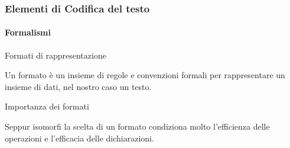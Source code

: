\begin{frame}
	\frametitle{Elementi di Codifica del testo}
	\framesubtitle{Formalismi}
	\addtocounter{nframe}{1}

	\begin{block}{Formati di rappresentazione}
		\begin{center}
			Un formato è un insieme di regole e convenzioni formali per rappresentare un insieme di dati, nel nostro caso un testo.
		\end{center}

	\end{block}

	\begin{block}{Importanza dei formati}
		\begin{center}
			Seppur isomorfi la scelta di un formato condiziona molto l'efficienza delle operazioni e l'efficacia delle dichiarazioni.
		\end{center}

	\end{block}


\end{frame}

%   
%



